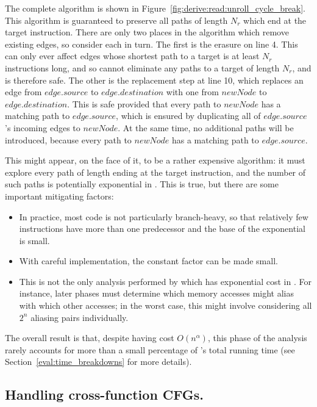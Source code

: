 The complete algorithm is shown in
Figure~\ref{fig:derive:read:unroll_cycle_break}.  This algorithm is
guaranteed to preserve all paths of length $N_r$ which end at the
target instruction.  There are only two places in the algorithm which
remove existing edges, so consider each in turn.  The first is the
erasure on line 4.  This can only ever affect edges whose shortest
path to a target is at least $N_r$ instructions long, and so cannot
eliminate any paths to a target of length $N_r$, and is therefore
safe.  The other is the replacement step at line 10, which replaces an
edge from $edge.source$ to $edge.destination$ with one from $newNode$
to $edge.destination$.  This is safe provided that every path to
$newNode$ has a matching path to $edge.source$, which is ensured by
duplicating all of $edge.source$'s incoming edges to $newNode$.  At
the same time, no additional paths will be introduced, because every
path to $newNode$ has a matching path to $edge.source$.

This might appear, on the face of it, to be a rather expensive
algorithm: it must explore every path of length \backref{$\alpha$}
ending at the target instruction, and the number of such paths is
potentially exponential in \backref{$\alpha$}.  This is true, but
there are some important mitigating factors:

\begin{itemize}
\item In practice, most code is not particularly branch-heavy, so that
  relatively few instructions have more than one predecessor and the
  base of the exponential is small.
\item With careful implementation, the constant factor can be made
  small.
\item This is not the only analysis performed by {\technique} which
  has exponential cost in \backref{$\alpha$}.  For instance, later
  phases must determine which memory accesses might alias with which
  other accesses; in the worst case, this might involve considering
  all $2^n$ aliasing pairs individually.
\end{itemize}

The overall result is that, despite having cost $O(n^{\alpha})$, this
phase of the analysis rarely accounts for more than a small percentage
of {\implementation}'s total running time (see
Section~\ref{eval:time_breakdowns} for more details).
  
\subsection{Handling cross-function CFGs.}

